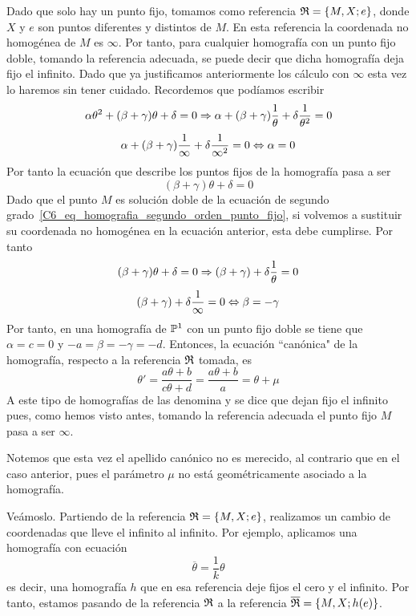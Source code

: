 Dado que solo hay un punto fijo, tomamos como referencia $\mathfrak{R}=\{M,X;e\}$, donde $X$ y $e$ son puntos diferentes y distintos de $M$. En esta referencia la coordenada no homogénea de $M$ es $\infty$. Por tanto, para cualquier homografía con un punto fijo doble, tomando la referencia adecuada, se puede decir que dicha homografía deja fijo el infinito. Dado que ya justificamos anteriormente los cálculo con $\infty$ esta vez lo haremos sin tener cuidado. Recordemos que podíamos escribir
\begin{equation*}
	\alpha\theta^2+(\beta+\gamma)\theta+\delta=0\Rightarrow\alpha+(\beta+\gamma)\frac{1}{\theta}+\delta\frac{1}{\theta^2}=0
\end{equation*}
\begin{equation*}
	\alpha+(\beta+\gamma)\frac{1}{\infty}+\delta\frac{1}{\infty^2}=0\Leftrightarrow \alpha=0
\end{equation*}
Por tanto la ecuación que describe los puntos fijos de la homografía pasa a ser
\begin{equation*}
	(\beta+\gamma)\theta+\delta=0
\end{equation*}
Dado que el punto $M$ es solución doble de la ecuación de segundo grado~\eqref{C6_eq_homografia_segundo_orden_punto_fijo}, si volvemos a sustituir su coordenada no homogénea en la ecuación anterior, esta debe cumplirse. Por tanto
\begin{equation*}
	(\beta+\gamma)\theta+\delta=0\Rightarrow(\beta+\gamma)+\delta\frac{1}{\theta}=0
\end{equation*}
\begin{equation*}
	(\beta+\gamma)+\delta\frac{1}{\infty}=0\Leftrightarrow \beta=-\gamma
\end{equation*}
Por tanto, en una homografía de $\mathbb{P}^1$ con un punto fijo doble se tiene que $\alpha=c=0$ y $-a=\beta=-\gamma=-d$. Entonces, la ecuación ``canónica" de la homografía, respecto a la referencia $\mathfrak{R}$ tomada, es
\begin{equation}
\theta'=\frac{a\theta+b}{c\theta +d}=\frac{a\theta+b}{a}=\theta+\mu
\end{equation}
A este tipo de homografías de las denomina  y se dice que dejan fijo el infinito pues, como hemos visto antes, tomando la referencia adecuada el punto fijo $M$ pasa a ser $\infty$.

Notemos que esta vez el apellido canónico no es merecido, al contrario que en el caso anterior, pues el parámetro $\mu$ no está geométricamente asociado a la homografía. 

Veámoslo. Partiendo de la referencia $\mathfrak{R}=\{M,X;e\}$, realizamos un cambio de coordenadas que lleve el infinito al infinito. Por ejemplo, aplicamos una homografía con ecuación
\begin{equation*}
	\overline{\theta}=\frac{1}{k}\theta
\end{equation*}
es decir, una homografía $h$ que en esa referencia deje fijos el cero y el infinito. Por tanto, estamos pasando de la referencia $\mathfrak{R}$ a la referencia $\overline{\mathfrak{R}}=\{M,X;h(e)\}$. 

